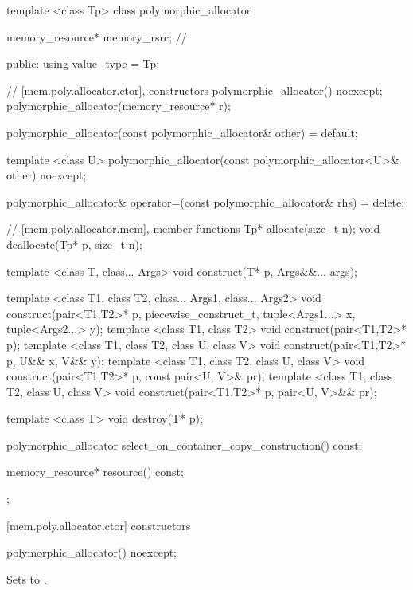 %
\begin{codeblock}
template <class Tp>
class polymorphic_allocator {
  memory_resource* memory_rsrc; // \expos

public:
  using value_type = Tp;

  // \ref{mem.poly.allocator.ctor}, constructors
  polymorphic_allocator() noexcept;
  polymorphic_allocator(memory_resource* r);

  polymorphic_allocator(const polymorphic_allocator& other) = default;

  template <class U>
    polymorphic_allocator(const polymorphic_allocator<U>& other) noexcept;

  polymorphic_allocator&
    operator=(const polymorphic_allocator& rhs) = delete;

  // \ref{mem.poly.allocator.mem}, member functions
  Tp* allocate(size_t n);
  void deallocate(Tp* p, size_t n);

  template <class T, class... Args>
  void construct(T* p, Args&&... args);

  template <class T1, class T2, class... Args1, class... Args2>
    void construct(pair<T1,T2>* p, piecewise_construct_t,
                   tuple<Args1...> x, tuple<Args2...> y);
  template <class T1, class T2>
    void construct(pair<T1,T2>* p);
  template <class T1, class T2, class U, class V>
    void construct(pair<T1,T2>* p, U&& x, V&& y);
  template <class T1, class T2, class U, class V>
    void construct(pair<T1,T2>* p, const pair<U, V>& pr);
  template <class T1, class T2, class U, class V>
    void construct(pair<T1,T2>* p, pair<U, V>&& pr);

  template <class T>
    void destroy(T* p);

  polymorphic_allocator select_on_container_copy_construction() const;

  memory_resource* resource() const;
};
\end{codeblock}


[mem.poly.allocator.ctor]{ constructors}

%
\begin{itemdecl}
polymorphic_allocator() noexcept;
\end{itemdecl}

\begin{itemdescr}
\pnum
\effects
Sets  to .
\end{itemdescr}

